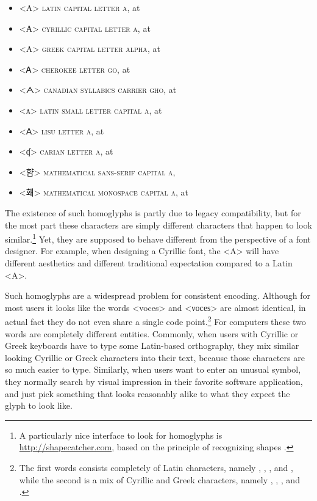 \begin{itemize}
	\item[] <{A}> \textsc{latin capital letter a}, at  
	\item[] <{А}> \textsc{cyrillic capital letter a}, at  
	\item[] <{Α}> \textsc{greek capital letter alpha}, at  
	\item[] <{Ꭺ}> \textsc{cherokee letter go}, at  
	\item[] <{ᗅ}> \textsc{canadian syllabics carrier gho}, at  
	\item[] <{ᴀ}> \textsc{latin small letter capital a}, at  
	\item[] <{ꓮ}> \textsc{lisu letter a}, at  
	\item[] <{ʠ}> \textsc{carian letter a}, at  
	\item[] <{햠}> \textsc{mathematical sans-serif capital a},  
	\item[] <{홰}> \textsc{mathematical monospace capital a}, at  
\end{itemize}

The existence of such homoglyphs is partly due to legacy compatibility, but for
the most part these characters are simply different characters that happen to
look similar.\footnote{A particularly nice interface to look for homoglyphs is
\url{http://shapecatcher.com}, based on the principle of recognizing shapes
\citep{Belongie2002}.} Yet, they are supposed to behave different from the
perspective of a font designer. For example, when designing a Cyrillic font, the
<A> will have different aesthetics and different traditional expectation
compared to a Latin <A>.

Such homoglyphs are a widespread problem for consistent encoding. Although for
most users it looks like the words <voces> and <νοсеѕ> are almost identical, in
actual fact they do not even share a single code point.\footnote{The first words
consists completely of Latin characters, namely , ,
,  and , while the second is a mix of Cyrillic
and Greek characters, namely , , , 
and .} For computers these two words are completely different
entities. Commonly, when users with Cyrillic or Greek keyboards have to type
some Latin-based orthography, they mix similar looking Cyrillic or Greek
characters into their text, because those characters are so much easier to type.
Similarly, when users want to enter an unusual symbol, they normally search by
visual impression in their favorite software application, and just pick
something that looks reasonably alike to what they expect the glyph to look
like.

